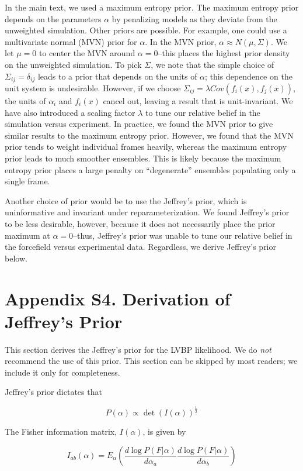 \documentclass[journal=jacsat,manuscript=article]{achemso}
\begin{document}
In the main text, we used a maximum entropy prior.  The maximum entropy prior depends on the parameters $\alpha$ by penalizing models as they deviate from the unweighted simulation.  Other priors are possible.  For example, one could use a multivariate normal (MVN) prior for $\alpha$.  In the MVN prior, $\alpha \approx N(\mu,\Sigma)$.  We let $\mu = 0$ to center the MVN around $\alpha = 0$--this places the highest prior density on the unweighted simulation.  To pick $\Sigma$, we note that the simple choice of $\Sigma_{ij} = \delta_{ij}$ leads to a prior that depends on the units of $\alpha$; this dependence on the unit system is undesirable.  However, if we choose $\Sigma_{ij} = \lambda Cov(f_i(x), f_j(x))$, the units of $\alpha_i$ and $f_i(x)$ cancel out, leaving a result that is unit-invariant.  We have also introduced a scaling factor $\lambda$ to tune our relative belief in the simulation versus experiment.  In practice, we found the MVN prior to give similar results to the maximum entropy prior.  However, we found that the MVN prior tends to weight individual frames heavily, whereas the maximum entropy prior leads to much smoother ensembles.  This is likely because the maximum entropy prior places a large penalty on ``degenerate'' ensembles populating only a single frame.  

Another choice of prior would be to use the Jeffrey's prior, which is uninformative and invariant under reparameterization.  We found Jeffrey's prior to be less desirable, however, because it does not necessarily place the prior maximum at $\alpha = 0$--thus, Jeffrey's prior was unable to tune our relative belief in the forcefield versus experimental data.  Regardless, we derive Jeffrey's prior below.


\section{Appendix S4.  Derivation of Jeffrey's Prior}

This section derives the Jeffrey's prior for the LVBP likelihood.  We do \emph{not} recommend the use of this prior.  This section can be skipped by most readers; we include it only for completeness.

Jeffrey's prior dictates that 

$$P(\alpha) \propto \det(I(\alpha))^\frac{1}{2}$$

The Fisher information matrix, $I(\alpha)$, is given by

$$I_{ab}(\alpha) = E_\alpha(\frac{d\log P(F|\alpha)}{d\alpha_{a}}\frac{d\log P(F|\alpha)}{d\alpha_{b}})$$
\end{document}
